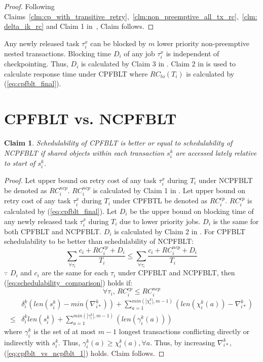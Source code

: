 \documentclass[preprint]{sigplanconf}
\newtheorem{clm}{Claim}
\begin{document}
%
\begin{proof}
%
Following Claims~\ref{clm:cp_with_transitive_retry},~\ref{clm:non_preemptive_all_tx_rc},~\ref{clm:delta_ik_rc}  and Claim 1 in~\cite{fblt}, Claim follows.
%
\end{proof}
%
Any newly released task $\tau_{i}^{x}$ can be blocked by $m$ lower priority non-preemptive nested transactions. Blocking time $D_{i}$ of any job $\tau_i^x$ is independent of checkpointing. Thus, $D_i$ is calculated by Claim 3 in \cite{fblt}. Claim 2 in \cite{fblt} is used to calculate response time under CPFBLT where $RC_{to}(T_{i})$ is calculated by (\ref{eq:cpfblt_final}).
%
\section{CPFBLT vs. NCPFBLT}\label{sec:schedulabiltiy comparison}

\begin{clm}\label{clm:cp_ncp_fblt_schedulabiltiy_comp}
%
Schedulability of CPFBLT is better or equal to schedulability of NCPFBLT if shared objects within each transaction $s_i^k$ are accessed lately relative to start of $s_i^k$.
%
\end{clm}
%
\begin{proof}
%
Let upper bound on retry cost of any task $\tau_{i}^{x}$ during $T_{i}$ under NCPFBLT be denoted as $RC_{i}^{ncp}$. $RC_{i}^{ncp}$ is calculated by Claim 1 in \cite{fblt}. Let upper bound on retry cost of any task $\tau_{i}^{x}$ during $T_{i}$ under CPFBTL be denoted as $RC_{i}^{cp}$. $RC_{i}^{cp}$ is calculated by (\ref{eq:cpfblt_final}). Let $D_{i}$ be the upper bound on blocking time of any newly released task $\tau_{i}^{x}$ during $T_{i}$ due to lower priority jobs. $D_{i}$ is the same for both CPFBLT and NCPFBLT. $D_{i}$ is calculated by Claim 2 in \cite{fblt}. For CPFBLT schedulability to be better than schedulability of NCPFBLT: 
%
\begin{equation}
\sum_{\forall\tau_{i}}\frac{c_{i}+RC_{i}^{cp}+D_{i}}{T_{i}}\le\sum_{\forall\tau_{i}}\frac{c_{i}+RC_{i}^{ncp}+D_{i}}{T_{i}}\label{eq:schedulability_comparison}
\end{equation}
$\because$ $D_{i}$ and $c_{i}$ are the same for each $\tau_{i}$
under CPFBLT and NCPFBLT, then (\ref{eq:schedulability_comparison})
holds if:
\[
\forall\tau_{i},\, RC_{i}^{cp}\le RC_{i}^{ncp}
\]
%
\begin{eqnarray}
 & \delta_{i}^{k}\left(len\left(s_{i}^{k}\right)-min\left(\nabla_{i*}^{k}\right)\right)+\sum_{a=1}^{min\left(|\chi_{i}^{k}|,m-1\right)}\left(len\left(\chi_{i}^{k}(a)\right)-\nabla_{i*}^{k}\right)\nonumber\\
\le & \delta_{i}^{k}len\left(s_{i}^{k}\right)+\sum_{a=1}^{min\left(|\gamma_{i}^{k}|,m-1\right)}\left(len\left(\gamma_{i}^{k}(a)\right)\right)
\label{eq:cpfblt_vs_ncpfblt_1}
\end{eqnarray}
%
where $\gamma_i^k$ is the set of at most $m-1$ longest transactions conflicting directly or indirectly with $s_i^k$. Thus, $\gamma_i^k(a) \ge \chi_i^k(a), \forall a$. Thus, by increasing $\nabla_{i*}^k$, (\ref{eq:cpfblt_vs_ncpfblt_1}) holds. Claim follows.
%
\end{proof}
%
\end{document}
